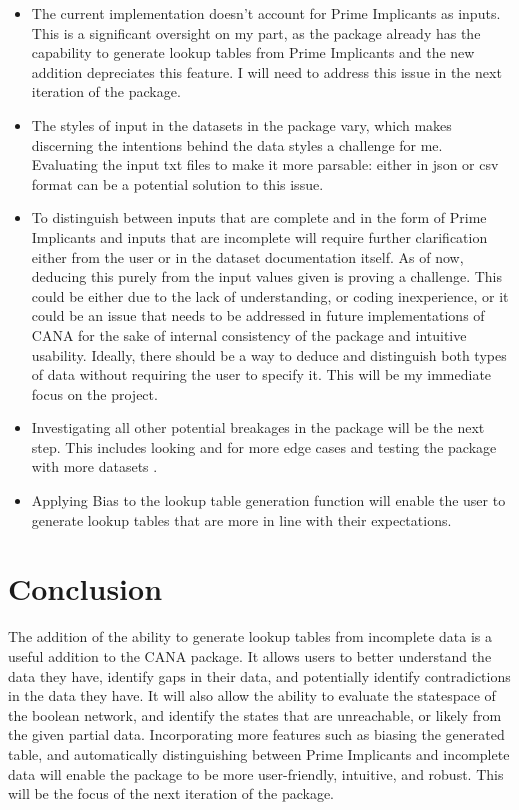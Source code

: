 \documentclass[letterpaper]{article}
\begin{document}
\begin{itemize}
    \item The current implementation doesn't account for Prime Implicants as inputs. 
    This is a significant oversight on my part, as the package already has the capability to generate lookup tables from Prime Implicants and the new addition depreciates this feature.
    I will need to address this issue in the next iteration of the package.
    \item The styles of input in the datasets in the package vary, which makes discerning the intentions behind the data styles a challenge for me. 
    Evaluating the input txt files to make it more parsable: either in json or csv format can be a potential solution to this issue.
    \item To distinguish between inputs that are complete and in the form of Prime Implicants and inputs that are incomplete will require further clarification either from the user or in the dataset documentation itself. 
    As of now, deducing this purely from the input values given is proving a challenge. 
    This could be either due to the lack of understanding, or coding inexperience, or it could be an issue that needs to be addressed in future implementations of CANA for the sake of internal consistency of the package and intuitive usability. Ideally, there should be a way to deduce and distinguish both types of data without requiring the user to specify it. This will be my immediate focus on the project. 
    \item Investigating all other potential breakages in the package will be the next step. This includes looking and for more edge cases and testing the package with more datasets .
    \item Applying Bias to the lookup table generation function will enable the user to generate lookup tables that are more in line with their expectations.
\end{itemize}

\section{Conclusion}
The addition of the ability to generate lookup tables from incomplete data is a useful addition to the CANA package.
It allows users to better understand the data they have, identify gaps in their data, and potentially identify contradictions in the data they have.
It will also allow the ability to evaluate the statespace of the boolean network, and identify the states that are unreachable, or likely from the given partial data.
Incorporating more features such as biasing the generated table, and automatically distinguishing between Prime Implicants and incomplete data will enable the package to be more user-friendly, intuitive, and robust.
This will be the focus of the next iteration of the package.
\end{document}
